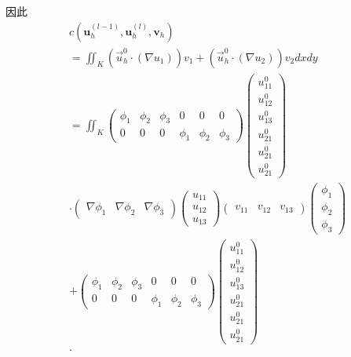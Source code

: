 \documentclass{ctexart}
\begin{document}
因此
\begin{align*}
    & c(\boldsymbol{u}_h^{(l-1)}, \boldsymbol{u}_h^{(l)}, \boldsymbol{v}_h) \\
    & = \iint_K (\vec{u}_h^0 \cdot (\nabla u_1)) v_1 + (\vec{u}_h^0 \cdot (\nabla u_2)) v_2dxdy\\
    & = \iint_K \begin{pmatrix}
      \phi_1&  \phi_2 &  \phi_3 & 0 & 0 & 0\\
      0 & 0 & 0 & \phi_1 & \phi_2 & \phi_3
    \end{pmatrix}
    \begin{pmatrix}
     u_{11}^0\\
     u_{12}^0\\
     u_{13}^0\\
     u_{21}^0\\
     u_{21}^0\\
     u_{21}^0
    \end{pmatrix} \\
    & \cdot 
    \begin{pmatrix}
     \nabla \phi_1 & \nabla \phi_2 & \nabla \phi_3
    \end{pmatrix}
    \begin{pmatrix}
     u_{11}\\
     u_{12}\\
     u_{13}
    \end{pmatrix}
    \begin{pmatrix}
     v_{11} & v_{12} & v_{13}
    \end{pmatrix}
    \begin{pmatrix}
     \phi_1\\
     \phi_2\\
    \phi_3
    \end{pmatrix}\\
    & + 
    \begin{pmatrix}
      \phi_1&  \phi_2 &  \phi_3 & 0 & 0 & 0\\
      0 & 0 & 0 & \phi_1 & \phi_2 & \phi_3
    \end{pmatrix}
    \begin{pmatrix}
     u_{11}^0\\
     u_{12}^0\\
     u_{13}^0\\
     u_{21}^0\\
     u_{21}^0\\
     u_{21}^0
    \end{pmatrix} \\
    & \cdot 

\end{align*}
\end{document}
